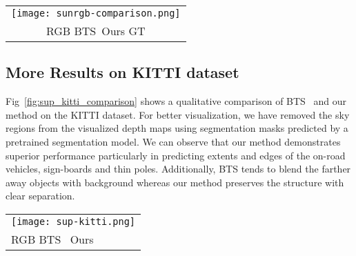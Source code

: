 \documentclass[final]{cvpr}
\begin{document}
\begin{figure*}[t]
    \centering
    \begin{tabular}{c}
         \texttt{[image: sunrgb-comparison.png]} \\
         \hspace{0.0\linewidth}RGB \hspace{0.15\linewidth}BTS~\cite{bts_lee2019big}\hspace{0.14\linewidth}Ours \hspace{0.17\linewidth}GT\\
    \end{tabular}
    
    \caption{Qualitative comparison of generalization from NYU-Depth-v2 to SUN RGB-D dataset. 
    Darker pixels are farther. Missing ground truth values are shown in white.}
    \label{fig:sup_sun_rgbd_comparison}
\end{figure*}

\subsection{More Results on KITTI dataset}
Fig~\ref{fig:sup_kitti_comparison} shows a qualitative comparison of BTS~\cite{bts_lee2019big} and our method on the KITTI dataset. For better visualization, we have removed the sky regions from the visualized depth maps using segmentation masks predicted by a pretrained segmentation model\cite{deeplabv3plus2018}. We can observe that our method demonstrates superior performance particularly in predicting extents and edges of the on-road vehicles, sign-boards and thin poles. Additionally, BTS tends to blend the farther away objects with background whereas our method preserves the structure with clear separation.

\begin{figure*}
    \centering
    \begin{tabular}{l}
         \texttt{[image: sup-kitti.png]} \\
         \hspace{0.13\linewidth}RGB \hspace{0.28\linewidth}BTS~\cite{bts_lee2019big} \hspace{0.28\linewidth}Ours\\
    \end{tabular}
    
    \caption{Qualitative comparison on KITTI dataset.}
    \label{fig:sup_kitti_comparison}
\end{figure*}
\end{document}
